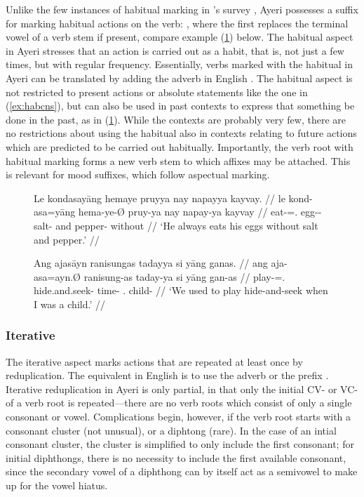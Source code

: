 Unlike the few instances of habitual marking in \citet{dahl1985}'s survey
\citep[96]{dahl1985}, Ayeri possesses a suffix for marking habitual actions on
the verb: , where the first  replaces the terminal vowel
of a verb stem if present, compare example (\ref{ex:habvwl}) below. The
habitual aspect in Ayeri stresses that an action is carried out as a habit,
that is, not just a few times, but with regular frequency. Essentially, verbs
marked with the habitual in Ayeri can be translated by adding the adverb
 in English \citep[97]{dahl1985}. The habitual aspect is not
restricted to present actions or absolute statements like the one in
(\ref{ex:habcns}), but can also be used in past contexts to express that
something  be done in the past, as in (\ref{ex:habvwl}). While the
contexts are probably very few, there are no restrictions about using the
habitual also in contexts relating to future actions which are predicted to be
carried out habitually. Importantly, the verb root with habitual marking forms
a new verb stem to which affixes may be attached. This is relevant for mood
suffixes, which follow aspectual marking.

\begin{figure}[h]
\pex
\a\label{ex:habcns}\begingl
	\gla Le kondasayāng hemaye pruyya nay napayya kayvay. //
	\glb le kond-asa=yāng hema-ye-Ø pruy-ya nay napay-ya kayvay //
	\glc \PatTI{} eat-\Hab{}=\TsgM{}.\Aarg{} egg-\Pl{}-\Top{} salt-\Loc{} 
		and pepper-\Loc{} without //
	\glft `He always eats his eggs without salt and pepper.' //
\endgl

\a\label{ex:habvwl}\begingl
	\gla Ang ajasāyn ranisungas tadayya si yāng ganas. //
	\glb ang aja-asa=ayn.Ø ranisung-as taday-ya si yāng gan-as //
	\glc \AgtT{} play-\Hab{}=\Fpl{}.\Top{} hide.and.seek-\Parg{} 
		time-\Loc{} \Rel{} \Fsg{}.\Aarg{} child-\Parg{} //
	\glft `We used to play hide-and-seek when I was a child.' //
\endgl
\xe
\end{figure}



\subsubsection{Iterative}
\label{subsubsec:iterative}

The iterative aspect marks actions that are repeated at least once by
reduplication. The equivalent in English is to use the adverb  or the
prefix . Iterative reduplication in Ayeri is only partial, in that only
the initial CV- or VC- of a verb root is repeated---there are no verb roots
which consist of only a single consonant or vowel. Complications begin,
however, if the verb root starts with a consonant cluster (not unusual), or a
diphtong (rare). In the case of an intial consonant cluster, the cluster is
simplified to only include the first consonant; for initial diphthongs, there
is no necessity to include the first available consonant, since the secondary
vowel of a diphthong can by itself act as a semivowel to make up for the vowel
hiatus.

